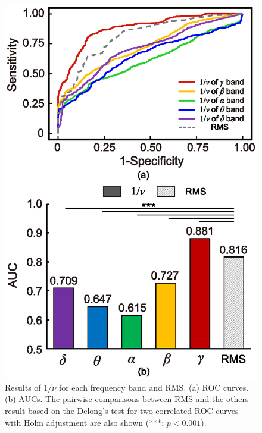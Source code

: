 \documentclass[journal]{IEEEtran}
\begin{document}
\begin{figure}[!t] %
\centering
\includegraphics[width=0.8\hsize]{figure/ROC_rms_ver5.eps}
\caption{Results of $1/\nu$ for each frequency band and RMS. (a) ROC curves. (b) AUCs. The pairwise comparisons between RMS and the others result based on the Delong's test for two correlated ROC curves with Holm adjustment are also shown (***: $p<0.001$).}
\label{fig:roc}
\end{figure}

\end{document}
